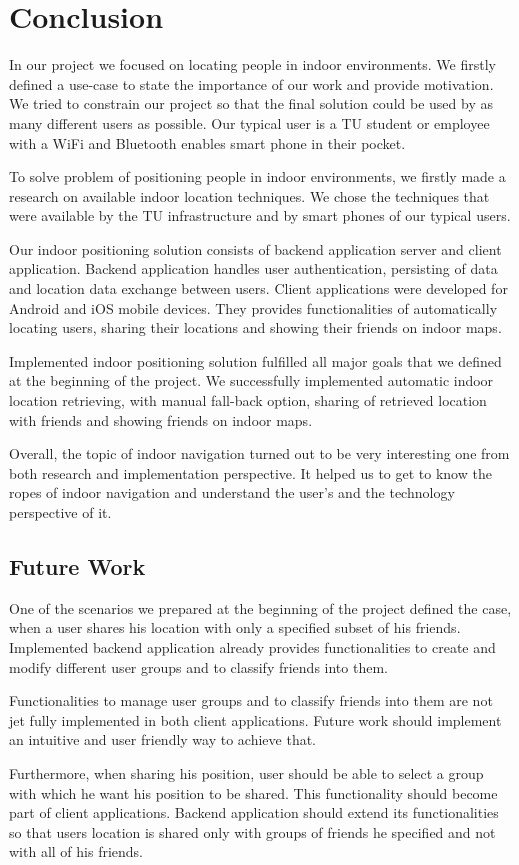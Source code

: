 \chapter{Conclusion}
\label{cha:conclusion}

In our project we focused on locating people in indoor environments. We firstly defined a use-case to state the importance of our work and provide motivation. We tried to constrain our project so that the final solution could be used by as many different users as possible. Our typical user is a TU student or employee with a WiFi and Bluetooth enables smart phone in their pocket. 

To solve problem of positioning people in indoor environments, we firstly made a research on available indoor location techniques. We chose the techniques that were available by the TU infrastructure and by smart phones of our typical users.

Our indoor positioning solution consists of backend application server and client application. Backend application handles user authentication, persisting of data and location data exchange between users. Client applications were developed for Android and iOS mobile devices. They provides functionalities of automatically locating users, sharing their locations and showing their friends on indoor maps. 

Implemented indoor positioning solution fulfilled all major goals that we defined at the beginning of the project. We successfully implemented automatic indoor location retrieving, with manual fall-back option, sharing of retrieved location with friends and showing friends on indoor maps.

Overall, the topic of indoor navigation turned out to be very interesting one from both research and implementation perspective. It helped us to get to know the ropes of indoor navigation and understand the user's and the technology perspective of it.

\vspace{0.5cm}

\section{Future Work}

One of the scenarios we prepared at the beginning of the project defined the case, when a user shares his location with only a specified subset of his friends. Implemented backend application already provides functionalities to create and modify different user groups and to classify friends into them. 

Functionalities to manage user groups and to classify friends into them are not jet fully implemented in both client applications. Future work should implement an intuitive and user friendly way to achieve that.

Furthermore, when sharing his position, user should be able to select a group with which he want his position to be shared. This functionality should become part of client applications. Backend application should extend its functionalities so that users location is shared only with groups of friends he specified and not with all of his friends.
